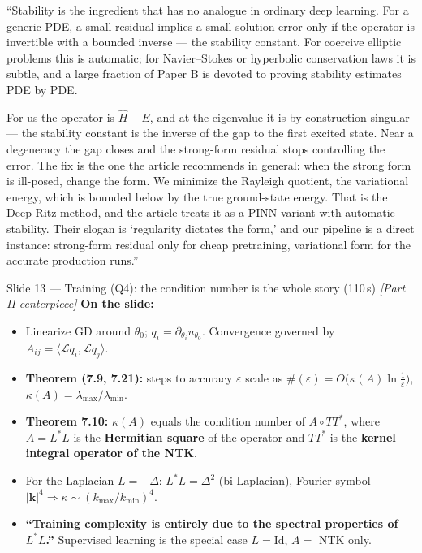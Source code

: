 \documentclass[11pt]{article}
\begin{document}
\begin{say}
``Stability is the ingredient that has no analogue in ordinary deep learning. For a generic PDE, a
small residual implies a small solution error only if the operator is invertible with a bounded
inverse --- the stability constant. For coercive elliptic problems this is automatic; for
Navier--Stokes or hyperbolic conservation laws it is subtle, and a large fraction of Paper B is
devoted to proving stability estimates PDE by PDE.

For us the operator is $\hat H - E$, and at the eigenvalue it is by construction singular --- the
stability constant is the inverse of the gap to the first excited state. Near a degeneracy the gap
closes and the strong-form residual stops controlling the error. The fix is the one the article
recommends in general: when the strong form is ill-posed, change the form. We minimize the Rayleigh
quotient, the variational energy, which is bounded below by the true ground-state energy. That is the
Deep Ritz method, and the article treats it as a PINN variant with automatic stability. Their slogan
is `regularity dictates the form,' and our pipeline is a direct instance: strong-form residual only
for cheap pretraining, variational form for the accurate production runs.''
\end{say}

\begin{slide}{Slide 13 --- Training (Q4): the condition number is the whole story (110\,s) \emph{[Part II centerpiece]}}
\textbf{On the slide:}
\begin{itemize}[leftmargin=*]
\item Linearize GD around $\theta_0$; $q_i=\partial_{\theta_i}u_{\theta_0}$. Convergence governed by
$A_{ij}=\langle\mathcal L q_i,\mathcal L q_j\rangle$.
\item \textbf{Theorem (7.9, 7.21):} steps to accuracy $\varepsilon$ scale as
$\#(\varepsilon)=O\!\big(\kappa(A)\ln\tfrac1\varepsilon\big)$, $\kappa(A)=\lambda_{\max}/\lambda_{\min}$.
\item \textbf{Theorem 7.10:} $\kappa(A)$ equals the condition number of $A\circ TT^\ast$, where
$A=L^\ast L$ is the \textbf{Hermitian square} of the operator and $TT^\ast$ is the \textbf{kernel
integral operator of the NTK}.
\item For the Laplacian $L=-\Delta$: $L^\ast L=\Delta^2$ (bi-Laplacian), Fourier symbol
$|\mathbf k|^4\Rightarrow\kappa\sim(k_{\max}/k_{\min})^4$.
\item \textbf{``Training complexity is entirely due to the spectral properties of $L^\ast L$.''}
Supervised learning is the special case $L=\mathrm{Id}$, $A=$ NTK only.
\end{itemize}
\end{slide}
\end{document}
